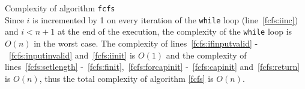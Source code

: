 \begin{sepproof}{Complexity of algorithm \texttt{fcfs}} \ \\
  Since $i$ is incremented by 1 on every iteration of the \texttt{while} loop (line~\ref{fcfs:iinc}) and $i < n+1$ at the
  end of the execution, the complexity of the \texttt{while} loop is $O\left(n\right)$ in the worst case. The complexity of
  lines~\ref{fcfs:ifinputvalid} -~\ref{fcfs:inputinvalid} and~\ref{fcfs:iinit} is $O\left(1\right)$ and the complexity of
  lines~\ref{fcfs:setlength} -~\ref{fcfs:finit},~\ref{fcfs:forcapinit} -~\ref{fcfs:capinit} and~\ref{fcfs:return} is
  $O\left(n\right)$, thus the total complexity of algorithm \ref{fcfs} is $O\left(n\right)$.
\end{sepproof}
